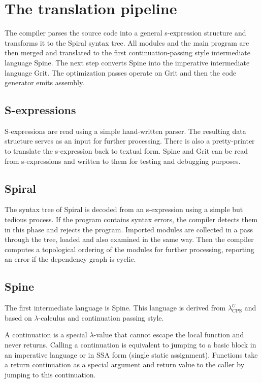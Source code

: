 \chapter{The translation pipeline}

The compiler parses the source code into a general s-expression structure and
transforms it to the Spiral syntax tree. All modules and the main program are
then merged and translated to the first continuation-passing style intermediate
language Spine. The next step converts Spine into the imperative intermediate
language Grit. The optimization passes operate on Grit and then the code
generator emits assembly.

\section{S-expressions}

S-expressions are read using a simple hand-written parser. The resulting data
structure serves as an input for further processing. There is also a
pretty-printer to translate the s-expression back to textual form. Spine and
Grit can be read from s-expressions and written to them for testing and
debugging purposes.

\section{Spiral}

The syntax tree of Spiral is decoded from an s-expression using a simple but tedious
process. If the program contains syntax errors, the compiler detects them in
this phase and rejects the program. Imported modules are collected in a pass
through the tree, loaded and also examined in the same way. Then the compiler
computes a topological ordering of the modules for further processing, reporting
an error if the dependency graph is cyclic.

\section{Spine}

The first intermediate language is Spine. This language is derived from
$\lambda^U_\text{CPS}$ \cite{kennedy2007compiling} and based on
$\lambda$-calculus and continuation passing style.

A continuation is a special $\lambda$-value that cannot escape the local
function and never returns. Calling a continuation is equivalent to jumping to a
basic block in an imperative language or in SSA form (single static assignment).
Functions take a return continuation as a special argument and return value to
the caller by jumping to this continuation.

